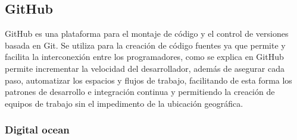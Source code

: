 \subsection{GitHub}
GitHub es una plataforma para el montaje de  código y el control de versiones
basada en Git. Se utiliza para la creación de código fuentes ya que permite y
facilita la interconexión entre los programadores, como se explica en \cite{github}
GitHub  permite incrementar la velocidad del desarrollador, además de asegurar
cada paso, automatizar los espacios y flujos de trabajo, facilitando de esta
forma los patrones de desarrollo e integración continua y permitiendo la creación
de equipos de trabajo sin el impedimento de la ubicación geográfica.

\subsubsection{Digital ocean}
